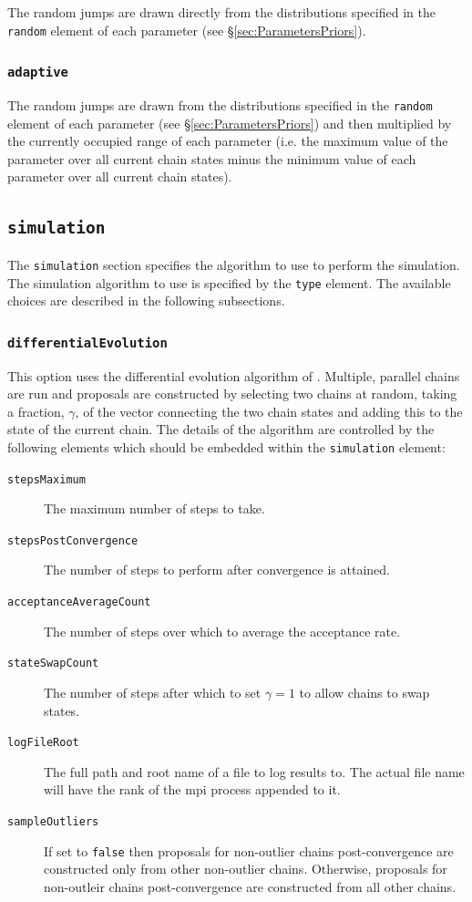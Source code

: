 The random jumps are drawn directly from the distributions specified in the {\tt random} element of each parameter (see \S\ref{sec:ParametersPriors}).

\subsubsection{{\tt adaptive}}

The random jumps are drawn from the distributions specified in the {\tt random} element of each parameter (see \S\ref{sec:ParametersPriors}) and then multiplied by the currently occupied range of each parameter (i.e. the maximum value of the parameter over all current chain states minus the minimum value of each parameter over all current chain states).

\subsection{{\tt simulation}}

The {\tt simulation} section specifies the algorithm to use to perform the simulation. The simulation algorithm to use is specified by the {\tt type} element. The available choices are described in the following subsections.

\subsubsection{{\tt differentialEvolution}}

This option uses the differential evolution algorithm of \cite{terr_braak_markov_2006}. Multiple, parallel chains are run and proposals are constructed by selecting two chains at random, taking a fraction, $\gamma$, of the vector connecting the two chain states and adding this to the state of the current chain. The details of the algorithm are controlled by the following elements which should be embedded within the {\tt simulation} element:
\begin{description}
\item[{\tt stepsMaximum}] The maximum number of steps to take.
\item[{\tt stepsPostConvergence}] The number of steps to perform after convergence is attained.
\item[{\tt acceptanceAverageCount}] The number of steps over which to average the acceptance rate.
\item[{\tt stateSwapCount}] The number of steps after which to set $\gamma=1$ to allow chains to swap states.
\item[{\tt logFileRoot}] The full path and root name of a file to log results to. The actual file name will have the rank of the \gls{mpi} process appended to it.
\item[{\tt sampleOutliers}] If set to {\tt false} then proposals for non-outlier chains post-convergence are constructed only from other non-outlier chains. Otherwise, proposals for non-outleir chains post-convergence are constructed from all other chains.
\end{description}

